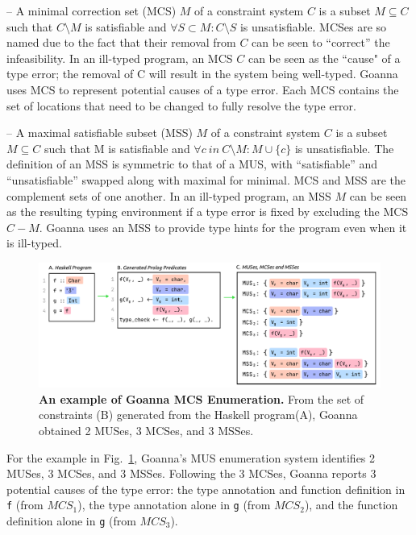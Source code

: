 \documentclass[pdflatex,lineno,sn-nature,Numbered]{sn-jnl}%
\begin{document}
    – A minimal correction set (MCS) $M$ of a constraint system $C$ is a subset $M \subseteq C$ such that $C \setminus M$ is satisfiable and $\forall{S} \subset M : C \setminus S$ is unsatisfiable. MCSes are so named due to the fact that their removal from $C$ can be seen to “correct” the infeasibility. In an ill-typed program, an MCS $C$ can be seen as the ``cause" of a type error; the removal of C will result in the system being well-typed. Goanna uses MCS to represent potential causes of a type error. Each MCS contains the set of locations that need to be changed to fully resolve the type error.

    – A maximal satisfiable subset (MSS) $M$ of a constraint system $C$ is a subset $M \subseteq C$ such that M is satisfiable and $\forall{c}\ in\ C \setminus M:M\cup\{c\}$ is unsatisfiable. The definition of an MSS is symmetric to that of a MUS, with “satisfiable” and “unsatisfiable” swapped along with maximal for minimal. MCS and MSS are the complement sets of one another. In an ill-typed program, an MSS $M$ can be seen as the resulting typing environment if a type error is fixed by excluding the MCS $C - M$. Goanna uses an MSS to provide type hints for the program even when it is ill-typed.
 
     \begin{figure}[ht!]
        \centering
        \includegraphics[width=\linewidth]{images/Enumeration-Example}
        \caption{\textbf{An example of Goanna MCS Enumeration.} From the set of constraints (B) generated from the Haskell program(A), Goanna obtained 2 MUSes, 3 MCSes, and 3 MSSes. }
        \label{fig:enumeration-example}
    \end{figure}
    
   For the example in Fig.~\ref{fig:enumeration-example}, Goanna's MUS enumeration system identifies 2 MUSes, 3 MCSes, and 3 MSSes. Following the 3 MCSes, Goanna reports 3 potential causes of the type error: the type annotation and function definition in \texttt{f} (from $MCS_1$), the type annotation alone in \texttt{g} (from $MCS_2$), and the function definition alone in \texttt{g} (from $MCS_3$). 
\end{document}

